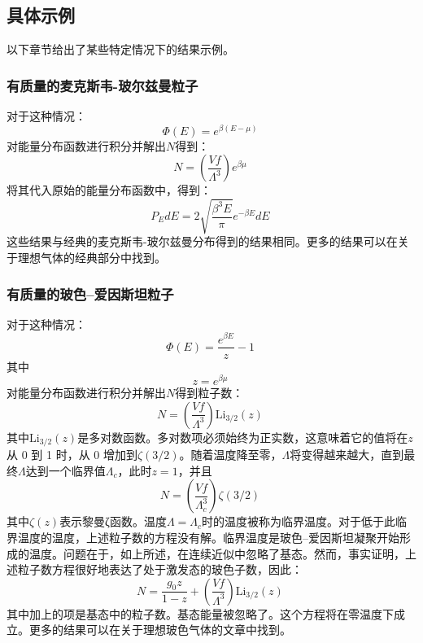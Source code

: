 \subsection{具体示例}  
以下章节给出了某些特定情况下的结果示例。
\subsubsection{有质量的麦克斯韦-玻尔兹曼粒子}  
对于这种情况：
\[
\Phi(E) = e^{\beta (E - \mu)}~
\]
对能量分布函数进行积分并解出\( N \)得到：
\[
N = \left( \frac{Vf}{\Lambda^3} \right) e^{\beta \mu}~
\]
将其代入原始的能量分布函数中，得到：
\[
P_E dE = 2 \sqrt{\frac{\beta^3 E}{\pi}} e^{-\beta E} dE~
\]
这些结果与经典的麦克斯韦-玻尔兹曼分布得到的结果相同。更多的结果可以在关于理想气体的经典部分中找到。
\subsubsection{有质量的玻色–爱因斯坦粒子}  
对于这种情况：
\[
\Phi(E) = \frac{e^{\beta E}}{z} - 1~
\]
其中
\[
z = e^{\beta \mu}~
\]
对能量分布函数进行积分并解出\( N \)得到粒子数：
\[
N = \left( \frac{Vf}{\Lambda^3} \right) \text{Li}_{3/2}(z)~
\]
其中\( \text{Li}_{3/2}(z) \)是多对数函数。多对数项必须始终为正实数，这意味着它的值将在\( z \)从 0 到 1 时，从 0 增加到\( \zeta(3/2) \)。随着温度降至零，\( \Lambda \)将变得越来越大，直到最终\( \Lambda \)达到一个临界值\( \Lambda_c \)，此时\( z = 1 \)，并且
\[
N = \left( \frac{Vf}{\Lambda_c^3} \right) \zeta(3/2)~
\]
其中\( \zeta(z) \)表示黎曼ζ函数。温度\( \Lambda = \Lambda_c \)时的温度被称为临界温度。对于低于此临界温度的温度，上述粒子数的方程没有解。临界温度是玻色–爱因斯坦凝聚开始形成的温度。问题在于，如上所述，在连续近似中忽略了基态。然而，事实证明，上述粒子数方程很好地表达了处于激发态的玻色子数，因此：
\[
N = \frac{g_0 z}{1 - z} + \left( \frac{Vf}{\Lambda^3} \right) \text{Li}_{3/2}(z)~
\]
其中加上的项是基态中的粒子数。基态能量被忽略了。这个方程将在零温度下成立。更多的结果可以在关于理想玻色气体的文章中找到。